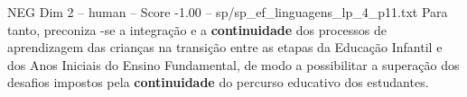 \begin{textsample}{NEG Dim 2 – human – Score -1.00 – sp/sp\_ef\_linguagens\_lp\_4\_p11.txt}  \label{ex:f2_neg_016}
Para tanto, preconiza -se a integração e a \textbf{continuidade} dos processos de aprendizagem das crianças na transição entre as etapas da Educação Infantil e dos Anos Iniciais do Ensino Fundamental, de modo a possibilitar a superação dos desafios impostos pela \textbf{continuidade} do percurso educativo dos estudantes.

\end{textsample}
